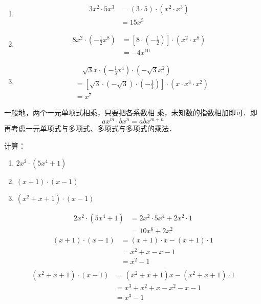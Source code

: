\begin{solution}
\begin{enumerate}
    \item \begin{align*}
        3x^2\cdot 5x^3&=(3\cdot 5)\cdot (x^2\cdot x^3)\tag{交换、结合律}\\
        &=15x^5
    \end{align*}
    \item \begin{align*}
        8x^2\cdot \left(-\frac{1}{2}x^8\right)&=\left[8\cdot \left(-\frac{1}{2}\right)\right]\cdot (x^2\cdot x^8)\\
        &=-4x^{10}
    \end{align*}
    \item \begin{align*}
      &\quad   \sqrt{3}x\cdot \left(-\frac{1}{3}x^4\right)\cdot \left(-\sqrt{3}x^2\right)\\      
      &= \left[\sqrt{3}\cdot \left(-\sqrt{3}\right)\cdot \left(-\frac{1}{3}\right)\right]\cdot (x\cdot x^4\cdot x^2)\\
      &=x^7 
    \end{align*}   
\end{enumerate} 
\end{solution}

一般地，两个一元单项式相乘，只要把各系数相
乘，未知数的指数相加即可．即
\[ ax^m\cdot bx^n =abx^{m+n}\]
再考虑一元单项式与多项式、多项式与多项式的乘法．

\begin{example}
    计算：
    \begin{enumerate}
        \item $2x^2\cdot (5x^4+1)$
        \item $(x+1)\cdot (x-1)$
        \item $(x^2+x+1)\cdot (x-1)$
    \end{enumerate}   
\end{example}

\begin{solution}
\begin{align*}
    2x^2\cdot (5x^4+1)&=2x^2\cdot 5x^4+ 2x^2\cdot 1\tag{分配律}\\
    &=10x^6+2x^2
\end{align*}
\begin{align*}
    (x+1)\cdot (x-1)&=(x+1)\cdot x-  (x+1)\cdot 1 \tag{分配律}\\
    &=x^2+x-x-1  \tag{分配律}\\
    &=x^2-1 \tag{合并同类项}\\
\end{align*}   
\begin{align*}
    (x^2+x+1)\cdot (x-1)&=(x^2+x+1)x-(x^2+x+1)\cdot 1\\
    &=x^3+x^2+x-x^2-x-1\\
    &=x^3-1
\end{align*}
\end{solution}

